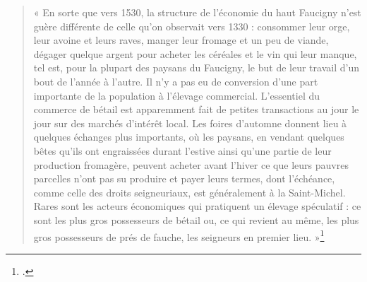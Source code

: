 \documentclass[12pt,a4paper]{report}
\begin{document}
	\begin{quote}
	« En sorte que vers 1530, la structure de l’économie du haut Faucigny n’est guère différente de celle qu’on observait vers 1330 : consommer leur orge, leur avoine et leurs raves, manger leur fromage et un peu de viande, dégager quelque argent pour acheter les céréales et le vin qui leur manque, tel est, pour la plupart des paysans du Faucigny, le but de leur travail d’un bout de l’année à l’autre. Il n’y a pas eu de conversion d’une part importante de la population à l’élevage commercial. L’essentiel du commerce de bétail est apparemment fait de petites transactions au jour le jour sur des marchés d’intérêt local. Les foires d’automne donnent lieu à quelques échanges plus importants, où les paysans, en vendant quelques bêtes qu’ils ont engraissées durant l’estive ainsi qu’une partie de leur production fromagère, peuvent acheter avant l’hiver ce que leurs pauvres parcelles n’ont pas su produire et payer leurs termes, dont l’échéance, comme celle des droits seigneuriaux, est généralement à la Saint-Michel. Rares sont les acteurs économiques qui pratiquent un élevage spéculatif : ce sont les plus gros possesseurs de bétail ou, ce qui revient au même, les plus gros possesseurs de prés de fauche, les seigneurs en premier lieu. »\footcite[372]{Carrier2001VieMontagnardeFaucigny}
\end{quote}
\end{document}
